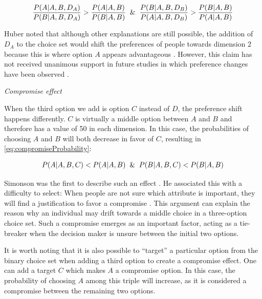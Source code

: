 \documentclass[a4paper,12pt]{article}
\newcommand{\citeyearonly}[1]{\citeyearpar{#1}}
\begin{document}
\begin{equation}\label{eq:attractionProbability}
    \frac{P(A|A,B,D_A)}{P(B|A,B,D_A)} > \frac{P(A|A,B)}{P(B|A,B)} \And \frac{P(B|A,B,D_B)}{P(A|A,B,D_B)} > \frac{P(B|A,B)}{P(A|A,B)}
\end{equation}

Huber noted that although other explanations are still possible, the addition of $D_A$ to the choice set would shift the preferences of people towards dimension 2 because this is where option $A$ appears advantageous \cite{huberEtAl82, bhatia2013associations}. However, this claim has not received unanimous support in future studies in which preference changes have been observed \citep{wedell1991distinguishing}.

\textit{Compromise effect}

When the third option we add is option $C$ instead of $D$, the preference shift happens differently. $C$ is virtually a middle option between $A$ and $B$ and therefore has a value of 50 in each dimension. In this case, the probabilities of choosing $A$ and $B$ will both decrease in favor of $C$, resulting in \ref{eq:compromiseProbability}:

\begin{align}\label{eq:compromiseProbability}
    P(A|A,B,C) < P(A|A,B) \And P(B|A,B,C) < P(B|A,B)
\end{align}

Simonson was the first to describe such an effect \citeyearonly{simonson89}. He associated this with a difficulty to select: When people are not sure which attribute is important, they will find a justification to favor a compromise \citep{simonson89}. This argument can explain the reason why an individual may drift towards a middle choice in a three-option choice set. Such a compromise emerges as an important factor, acting as a tie-breaker when the decision maker is unsure between the initial two options. 

It is worth noting that it is also possible to ``target'' a particular option from the binary choice set when adding a third option to create a compromise effect. One can add a target $C$ which makes $A$ a compromise option. In this case, the probability of choosing $A$ among this triple will increase, as it is considered a compromise between the remaining two options. 
\end{document}
